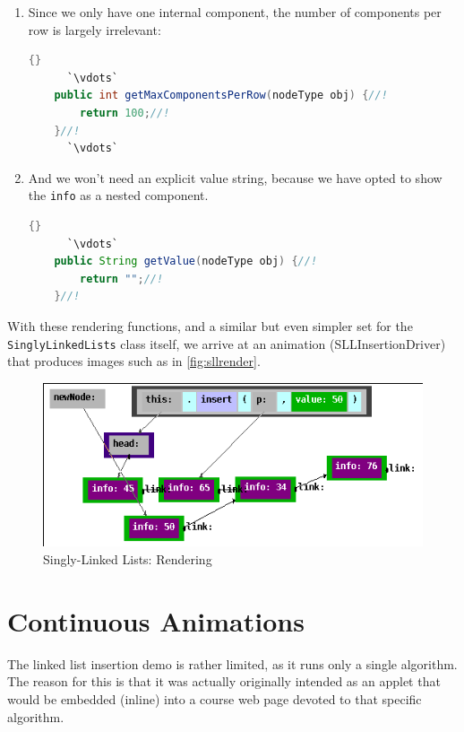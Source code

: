 \documentclass[11pt,titlepage]{book}
\begin{document}
\begin{enumerate}
\item Since we only have one internal component, the number of components per row is largely irrelevant:
\begin{lstlisting}[language=Java,frame=tb]{}
      `\vdots`
    public int getMaxComponentsPerRow(nodeType obj) {//!
        return 100;//!
    }//!
      `\vdots`
\end{lstlisting}

\item And we won't need an explicit value string, because we have opted to show the \texttt{info} as a nested component.
\begin{lstlisting}[language=Java,frame=tb]{}
      `\vdots`
    public String getValue(nodeType obj) {//!
        return "";//!
    }//!
\end{lstlisting}
\end{enumerate}

With these rendering functions, and a similar but even simpler set for the \texttt{SinglyLinkedLists} class itself, we arrive at an animation (SLLInsertionDriver) that produces images such as in \autoref{fig:sllrender}.

\begin{figure}
  \begin{center}
    \includegraphics[scale=0.5]{images/sllrender}
  \end{center}
  \caption{Singly-Linked Lists: Rendering}\label{fig:sllrender}
  
\end{figure}



\section{Continuous Animations}\label{looping}

The linked list insertion demo is rather limited, as it runs only a
single algorithm. The reason for this is that it was actually
originally intended as an applet that would be embedded (inline) into a course
web page devoted to that specific algorithm.
\end{document}
